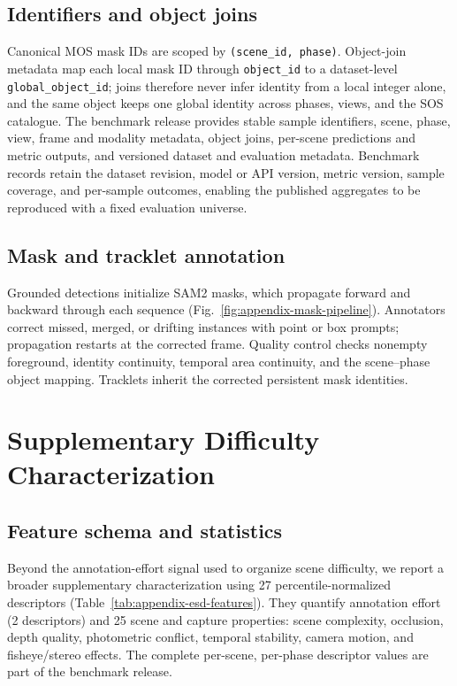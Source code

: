 \subsection{Identifiers and object joins}

Canonical MOS mask IDs are scoped by \texttt{(scene\_id, phase)}. Object-join metadata map each local mask ID through \texttt{object\_id} to a dataset-level \texttt{global\_object\_id}; joins therefore never infer identity from a local integer alone, and the same object keeps one global identity across phases, views, and the SOS catalogue. The benchmark release provides stable sample identifiers, scene, phase, view, frame and modality metadata, object joins, per-scene predictions and metric outputs, and versioned dataset and evaluation metadata. Benchmark records retain the dataset revision, model or API version, metric version, sample coverage, and per-sample outcomes, enabling the published aggregates to be reproduced with a fixed evaluation universe.

\subsection{Mask and tracklet annotation}

Grounded detections initialize SAM2 masks, which propagate forward and backward through each sequence (Fig.~\ref{fig:appendix-mask-pipeline}). Annotators correct missed, merged, or drifting instances with point or box prompts; propagation restarts at the corrected frame. Quality control checks nonempty foreground, identity continuity, temporal area continuity, and the scene--phase object mapping. Tracklets inherit the corrected persistent mask identities.

\section{Supplementary Difficulty Characterization}
\label{sec:appendix-esd}

\subsection{Feature schema and statistics}

Beyond the annotation-effort signal used to organize scene difficulty, we report a broader supplementary characterization using 27 percentile-normalized descriptors (Table~\ref{tab:appendix-esd-features}). They quantify annotation effort (2 descriptors) and 25 scene and capture properties: scene complexity, occlusion, depth quality, photometric conflict, temporal stability, camera motion, and fisheye/stereo effects. The complete per-scene, per-phase descriptor values are part of the benchmark release.


